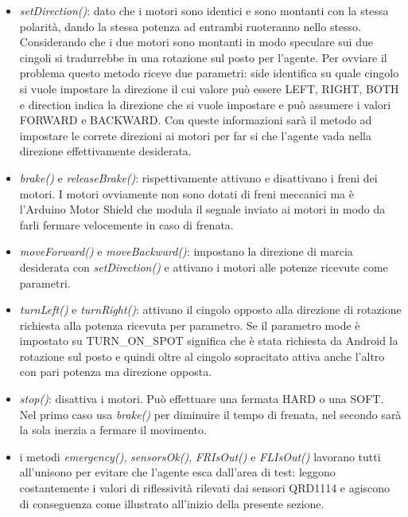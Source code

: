 \begin{itemize}
\item \emph{setDirection()}: dato che i motori sono identici e 
sono montanti con la stessa polarità, dando la stessa potenza ad entrambi 
ruoteranno nello stesso. Considerando che i due motori sono montanti in modo speculare sui due cingoli
si tradurrebbe in una rotazione sul posto per l'agente. Per ovviare 
il problema questo metodo riceve due parametri: side identifica su quale cingolo
si vuole impostare la direzione il cui valore può essere LEFT, RIGHT, BOTH e direction
indica la direzione che si vuole impostare e può assumere i valori FORWARD e BACKWARD.
Con queste informazioni sarà il metodo ad impostare le correte direzioni ai motori 
per far si che l'agente vada nella direzione effettivamente desiderata.
\item \emph{brake()} e \emph{releaseBrake()}: rispettivamente attivano e disattivano i 
freni dei motori. I motori ovviamente non sono dotati di freni meccanici ma è 
l'Arduino Motor Shield che modula il segnale inviato ai motori in modo da farli 
fermare velocemente in caso di frenata.
\item \emph{moveForward()} e \emph{moveBackward()}: impostano la direzione di marcia 
desiderata con \emph{setDirection()} e attivano i motori alle potenze ricevute come 
parametri.
\item \emph{turnLeft()} e \emph{turnRight()}: attivano il cingolo opposto alla 
direzione di rotazione richiesta alla potenza ricevuta per parametro. Se il  parametro
mode è impostato su TURN\_ON\_SPOT significa che è stata richiesta da Android la 
rotazione sul posto e quindi oltre al cingolo sopracitato attiva anche l'altro 
con pari potenza ma direzione opposta.
\item \emph{stop()}: disattiva i motori. Può effettuare una fermata HARD o una SOFT.
Nel primo caso usa \emph{brake()} per diminuire il tempo di frenata, nel secondo sarà la 
sola inerzia a fermare il movimento.
\item i metodi \emph{emergency()}, \emph{sensorsOk()}, \emph{FRIsOut()} e \emph{FLIsOut()}
lavorano tutti all'unisono per evitare che l'agente esca dall'area di test: leggono costantemente 
i valori di riflessività rilevati dai sensori QRD1114 e agiscono di conseguenza come 
illustrato all'inizio della presente sezione. 



\end{itemize}